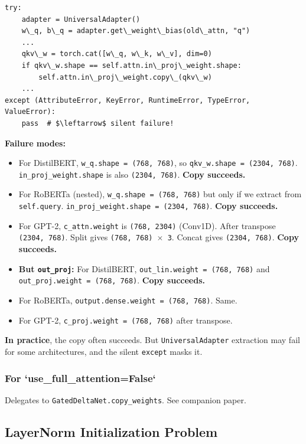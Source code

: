 \begin{lstlisting}
try:
    adapter = UniversalAdapter()
    w\_q, b\_q = adapter.get\_weight\_bias(old\_attn, "q")
    ...
    qkv\_w = torch.cat([w\_q, w\_k, w\_v], dim=0)
    if qkv\_w.shape == self.attn.in\_proj\_weight.shape:
        self.attn.in\_proj\_weight.copy\_(qkv\_w)
    ...
except (AttributeError, KeyError, RuntimeError, TypeError, ValueError):
    pass  # $\leftarrow$ silent failure!
\end{lstlisting}

\textbf{Failure modes:}
\begin{itemize}
\item For DistilBERT, \texttt{w\_q.shape = (768, 768)}, so \texttt{qkv\_w.shape = (2304, 768)}.
  \texttt{in\_proj\_weight.shape} is also \texttt{(2304, 768)}. \textbf{Copy succeeds.}
\item For RoBERTa (nested), \texttt{w\_q.shape = (768, 768)} but only if we extract from
  \texttt{self.query}. \texttt{in\_proj\_weight.shape = (2304, 768)}. \textbf{Copy succeeds.}
\item For GPT-2, \texttt{c\_attn.weight} is \texttt{(768, 2304)} (Conv1D). After transpose
  \texttt{(2304, 768)}. Split gives \texttt{(768, 768) $\times$ 3}. Concat gives \texttt{(2304, 768)}.
  \textbf{Copy succeeds.}
\item \textbf{But \texttt{out\_proj}:} For DistilBERT, \texttt{out\_lin.weight = (768, 768)} and
  \texttt{out\_proj.weight = (768, 768)}. \textbf{Copy succeeds.}
\item For RoBERTa, \texttt{output.dense.weight = (768, 768)}. Same.
\item For GPT-2, \texttt{c\_proj.weight = (768, 768)} after transpose.

\end{itemize}
\textbf{In practice}, the copy often succeeds. But \texttt{UniversalAdapter} extraction 
may fail for some architectures, and the silent \texttt{except} masks it.

\subsubsection{For `use\_full\_attention=False`}

Delegates to \texttt{GatedDeltaNet.copy\_weights}. See companion paper.

\subsection{LayerNorm Initialization Problem}

